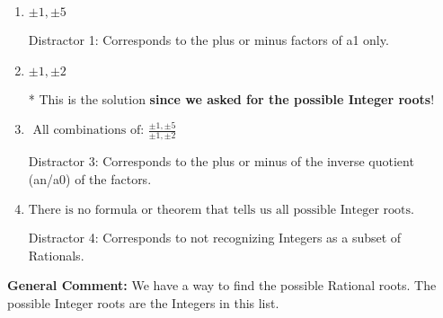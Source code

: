 \documentclass{extbook}[14pt]
\begin{document}
\begin{enumerate}
{\begin{enumerate}[label=\Alph*.]
This would have been the solution \textbf{if asked for the possible Rational roots}!
\item \( \pm 1,\pm 5 \)

 Distractor 1: Corresponds to the plus or minus factors of a1 only.
\item \( \pm 1,\pm 2 \)

* This is the solution \textbf{since we asked for the possible Integer roots}!
\item \( \text{ All combinations of: }\frac{\pm 1,\pm 5}{\pm 1,\pm 2} \)

 Distractor 3: Corresponds to the plus or minus of the inverse quotient (an/a0) of the factors. 
\item \( \text{There is no formula or theorem that tells us all possible Integer roots.} \)

 Distractor 4: Corresponds to not recognizing Integers as a subset of Rationals.
\end{enumerate}

\textbf{General Comment:} We have a way to find the possible Rational roots. The possible Integer roots are the Integers in this list.
}
\end{enumerate}
\end{document}
